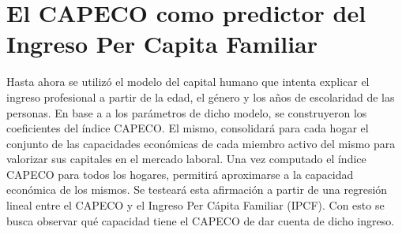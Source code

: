 \section{El CAPECO como predictor del Ingreso Per Capita Familiar}

Hasta ahora se utilizó el modelo del capital humano que intenta explicar el ingreso profesional a partir de la edad, el género y los años de escolaridad de las personas. En base a a los parámetros de dicho modelo, se construyeron los coeficientes del índice CAPECO. El mismo, consolidará para cada hogar el conjunto de las capacidades económicas de cada miembro activo del mismo para valorizar sus capitales en el mercado laboral. Una vez computado el índice CAPECO para todos los hogares, permitirá aproximarse a la capacidad económica de los mismos. Se testeará esta afirmación a partir de una regresión lineal entre el CAPECO y el Ingreso Per Cápita Familiar (IPCF). Con esto se busca observar qué capacidad tiene el CAPECO de dar cuenta de dicho ingreso.

